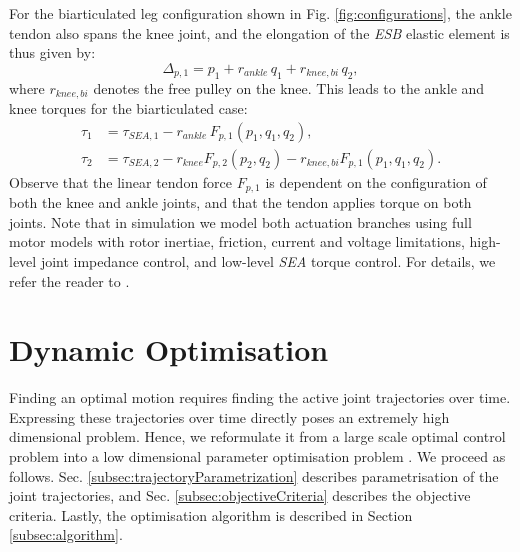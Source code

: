 \documentclass[letterpaper, 10 pt, conference]{ieeeconf}  %
\begin{document}
For the biarticulated leg configuration shown in Fig. \ref{fig:configurations}, the ankle tendon also spans the knee joint, and the elongation of the \textit{ESB} elastic element is thus given by:
\begin{equation}
	\Delta_{p,1} = p_1 + r_{ankle} \, q_1 + r_{knee,bi} \, q_2,
	\label{eq:Delta_p_biart}
\end{equation}
where $r_{knee,bi}$ denotes the free pulley on the knee. This leads to the ankle and knee torques for the biarticulated case:
\begin{equation}
	\begin{aligned}
		\tau_1 &= \tau_{SEA,1} - r_{ankle} \, F_{p,1} \left( p_1, q_1, q_2 \right), \\
		\tau_2 &= \tau_{SEA,2} - r_{knee} F_{p,2} \left( p_2, q_2 \right) - r_{knee,bi} F_{p,1} \left( p_1, q_1, q_2 \right).
	\end{aligned}
\end{equation}
Observe that the linear tendon force $F_{p,1}$ is dependent on the configuration of both the knee and ankle joints, and that the tendon applies torque on both joints.
Note that in simulation we model both actuation branches using full motor models with rotor inertiae, friction, current and voltage limitations, high-level joint impedance control, and low-level \textit{SEA} torque control. For details, we refer the reader to \cite{roozing2016design}.


\section{Dynamic Optimisation} 
\label{sec:dynamicOptimisation}
Finding an optimal motion requires finding the active joint trajectories over time. Expressing these trajectories over time directly poses an extremely high dimensional problem. Hence, we reformulate it from a large scale optimal control problem into a low dimensional parameter optimisation problem \cite{kaphle2008optimality}. We proceed as follows. Sec. \ref{subsec:trajectoryParametrization} describes parametrisation of the joint trajectories, and Sec. \ref{subsec:objectiveCriteria} describes the objective criteria. Lastly, the optimisation algorithm is described in Section \ref{subsec:algorithm}.
\end{document}
